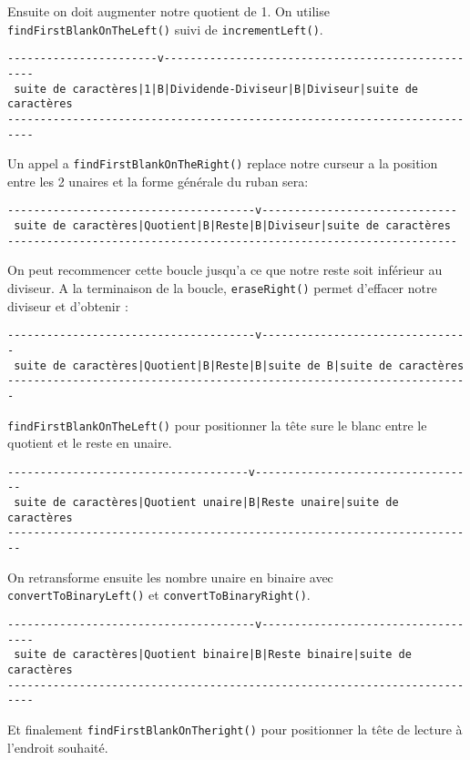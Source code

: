 \documentclass[a4paper,11pt]{article}
\begin{document}
Ensuite on doit augmenter notre quotient de 1. On utilise \texttt{findFirstBlankOnTheLeft()} suivi de \texttt{incrementLeft()}.
\begin{small}
\begin{verbatim}
-----------------------v--------------------------------------------------
 suite de caractères|1|B|Dividende-Diviseur|B|Diviseur|suite de caractères
--------------------------------------------------------------------------
\end{verbatim}
\end{small}
Un appel a \texttt{findFirstBlankOnTheRight()} replace notre curseur a la position entre les 2 unaires et la forme générale du ruban sera: 
\begin{small}
\begin{verbatim}
--------------------------------------v------------------------------
 suite de caractères|Quotient|B|Reste|B|Diviseur|suite de caractères
---------------------------------------------------------------------
\end{verbatim}
\end{small}
On peut recommencer cette boucle jusqu'a ce que notre reste soit inférieur au diviseur. A la terminaison de la boucle, \texttt{eraseRight()} permet d'effacer notre diviseur
et d'obtenir :
\begin{small}
\begin{verbatim}
--------------------------------------v--------------------------------
 suite de caractères|Quotient|B|Reste|B|suite de B|suite de caractères
-----------------------------------------------------------------------
\end{verbatim}
\end{small}
\texttt{findFirstBlankOnTheLeft()} pour positionner la tête sure le blanc entre le quotient et le reste en unaire.
\begin{small}
\begin{verbatim}
-------------------------------------v----------------------------------
 suite de caractères|Quotient unaire|B|Reste unaire|suite de caractères
------------------------------------------------------------------------
\end{verbatim}
\end{small}
On retransforme ensuite les nombre unaire en binaire avec \texttt{convertToBinaryLeft()} et \texttt{convert\-To\-Binary\-Right()}.
\begin{small}
\begin{verbatim}
--------------------------------------v-----------------------------------
 suite de caractères|Quotient binaire|B|Reste binaire|suite de caractères
--------------------------------------------------------------------------
\end{verbatim}
\end{small}
Et finalement \texttt{findFirstBlankOnTheright()} pour positionner la tête de lecture à l'endroit souhaité.
\end{document}
